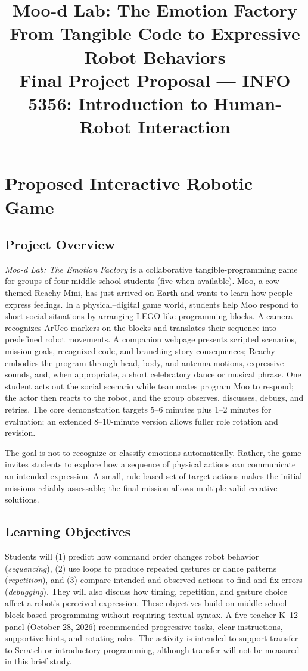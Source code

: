 \documentclass[conference,12pt,letterpaper]{IEEEtran}
\title{Moo-d Lab: The Emotion Factory\\
\large From Tangible Code to Expressive Robot Behaviors\\
Final Project Proposal --- INFO 5356: Introduction to Human-Robot Interaction}
\author{\IEEEauthorblockN{Elliot Zhang, Jaclyn Pham, Yifan (Fanning) Luo, Jiaxin (Aurora) Shen}
\IEEEauthorblockA{Cornell Tech\\
\{qz432, cqp4, yl4389, js3996\}@cornell.edu}}
\begin{document}
\maketitle

\section{Proposed Interactive Robotic Game}
\subsection{Project Overview}
\emph{Moo-d Lab: The Emotion Factory} is a collaborative tangible-programming game for groups of four middle school students (five when available). Moo, a cow-themed Reachy Mini, has just arrived on Earth and wants to learn how people express feelings. In a physical--digital game world, students help Moo respond to short social situations by arranging LEGO-like programming blocks. A camera recognizes ArUco markers on the blocks and translates their sequence into predefined robot movements. A companion webpage presents scripted scenarios, mission goals, recognized code, and branching story consequences; Reachy embodies the program through head, body, and antenna motions, expressive sounds, and, when appropriate, a short celebratory dance or musical phrase. One student acts out the social scenario while teammates program Moo to respond; the actor then reacts to the robot, and the group observes, discusses, debugs, and retries. The core demonstration targets 5--6 minutes plus 1--2 minutes for evaluation; an extended 8--10-minute version allows fuller role rotation and revision.

The goal is not to recognize or classify emotions automatically. Rather, the game invites students to explore how a sequence of physical actions can communicate an intended expression. A small, rule-based set of target actions makes the initial missions reliably assessable; the final mission allows multiple valid creative solutions.

\subsection{Learning Objectives}
Students will (1) predict how command order changes robot behavior (\emph{sequencing}), (2) use loops to produce repeated gestures or dance patterns (\emph{repetition}), and (3) compare intended and observed actions to find and fix errors (\emph{debugging}). They will also discuss how timing, repetition, and gesture choice affect a robot's perceived expression. These objectives build on middle-school block-based programming without requiring textual syntax. A five-teacher K--12 panel (October 28, 2026) recommended progressive tasks, clear instructions, supportive hints, and rotating roles. The activity is intended to support transfer to Scratch or introductory programming, although transfer will not be measured in this brief study.
\end{document}
